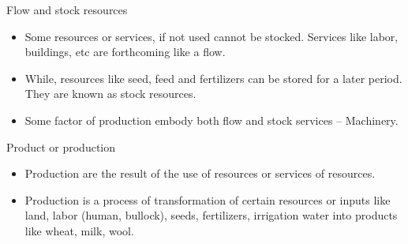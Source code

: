 \documentclass[12pt,ignorenonframetext,aspectratio=169]{beamer}
\providecommand{\tightlist}{%
  \setlength{\itemsep}{0pt}\setlength{\parskip}{0pt}}
\begin{document}
\begin{frame}{}
\protect\hypertarget{section-5}{}

\begin{block}{Flow and stock resources}

\begin{itemize}
\tightlist
\item
  Some resources or services, if not used cannot be stocked. Services
  like labor, buildings, etc are forthcoming like a flow.
\item
  While, resources like seed, feed and fertilizers can be stored for a
  later period. They are known as stock resources.
\item
  Some factor of production embody both flow and stock services --
  Machinery.
\end{itemize}

\end{block}

\begin{block}{Product or production}

\begin{itemize}
\tightlist
\item
  Production are the result of the use of resources or services of
  resources.
\item
  Production is a process of transformation of certain resources or
  inputs like land, labor (human, bullock), seeds, fertilizers,
  irrigation water into products like wheat, milk, wool.
\end{itemize}

\end{block}

\end{frame}
\end{document}

